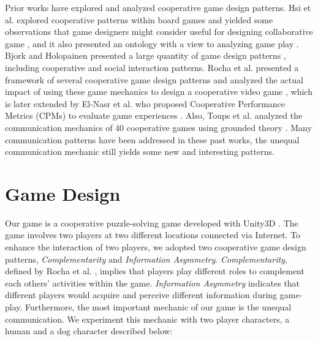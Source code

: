 \documentclass{sigchi}
\begin{document}
Prior works have explored and analyzed cooperative game design patterns. Hsi et al. explored cooperative patterns within board games and yielded some observations that game designers might consider useful for designing collaborative game \cite{CG1}, and it also presented an ontology with a view to analyzing game play \cite{CG3}. 
Bjork and Holopainen presented a large quantity of game design patterns \cite{CG2}, including cooperative and social interaction patterns.
Rocha et al. presented a framework of several cooperative game design patterns and analyzed the actual impact of using these game mechanics to design a cooperative video game \cite{CG4}, which is later extended by El-Nasr et al. who proposed Cooperative Performance Metrics (CPMs) to evaluate game experiences \cite{CPMs}.
Also, Toups et al. analyzed the communication mechanics of 40 cooperative games using grounded theory \cite{CG5}.
Many communication patterns have been addressed in these past works, the unequal communication mechanic still yields some new and interesting patterns.

\section{Game Design}



Our game is a cooperative puzzle-solving game developed with Unity3D \cite{Unity}. The game involves two players at two different locations connected via Internet.
To enhance the interaction of two players, we adopted two cooperative game design patterns, \textit{Complementarity} and \textit{Information Asymmetry}.
\textit{Complementarity}, defined by Rocha et al. \cite{CG4}, implies that players play different roles to complement each others' activities within the game. 
\textit{Information Asymmetry} indicates that different players would acquire and perceive different information during game-play.
Furthermore, the most important mechanic of our game is the unequal communication.
We experiment this mechanic with two player characters, a human and a dog character described below:
\end{document}
